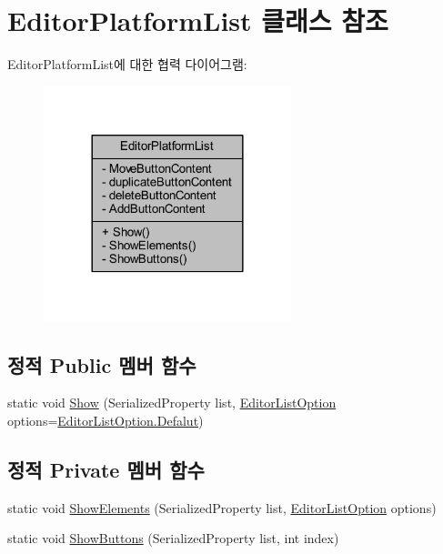 \hypertarget{class_editor_platform_list}{}\section{Editor\+Platform\+List 클래스 참조}
\label{class_editor_platform_list}


Editor\+Platform\+List에 대한 협력 다이어그램\+:\nopagebreak
\begin{figure}[H]
\begin{center}
\leavevmode
\includegraphics[width=204pt]{d8/d90/class_editor_platform_list__coll__graph}
\end{center}
\end{figure}
\subsection*{정적 Public 멤버 함수}
\begin{DoxyCompactItemize}
\item 
static void \mbox{\hyperlink{class_editor_platform_list_afa78a25fbabdf962ead1dfefbddf50fd}{Show}} (Serialized\+Property list, \mbox{\hyperlink{_editor_list_option_8cs_a5da45ed8a8d189e2c165cf7e1c6ceb29}{Editor\+List\+Option}} options=\mbox{\hyperlink{_editor_list_option_8cs_a5da45ed8a8d189e2c165cf7e1c6ceb29a3f65886bc4b4c4e553684df4fb5fdba9}{Editor\+List\+Option.\+Defalut}})
\end{DoxyCompactItemize}
\subsection*{정적 Private 멤버 함수}
\begin{DoxyCompactItemize}
\item 
static void \mbox{\hyperlink{class_editor_platform_list_a70c387e1de68662d17fae0513cdd7ae7}{Show\+Elements}} (Serialized\+Property list, \mbox{\hyperlink{_editor_list_option_8cs_a5da45ed8a8d189e2c165cf7e1c6ceb29}{Editor\+List\+Option}} options)
\item 
static void \mbox{\hyperlink{class_editor_platform_list_ae482c7e2b601a4f6906ef4dccd25afab}{Show\+Buttons}} (Serialized\+Property list, int index)
\end{DoxyCompactItemize}
